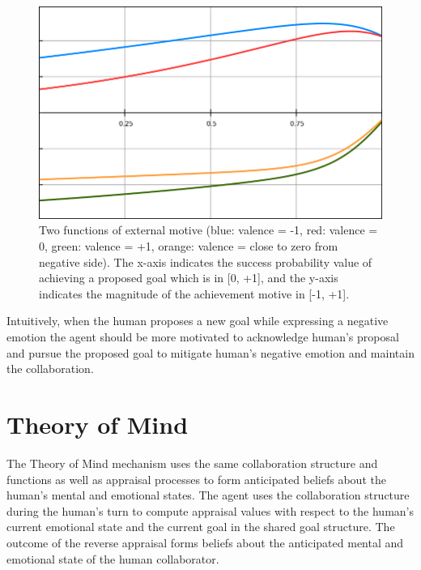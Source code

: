 \documentclass[12pt]{report}
\begin{document}
\begin{figure}[tbh]
  \centering
  \includegraphics[width=1\textwidth]{figure/external_motive_functions.png}
  \caption{Two functions of external motive (blue: valence = -1, red:
  valence = 0, green: valence = +1, orange: valence = close to zero from
  negative side). The x-axis indicates the success probability value of
  achieving a proposed goal which is in [0, +1], and the y-axis indicates the
  magnitude of the achievement motive in [-1, +1].}
  \label{fig:external-motive-functions}
\end{figure}

Intuitively, when the human proposes a new goal while expressing a negative
emotion the agent should be more motivated to acknowledge human's proposal and
pursue the proposed goal to mitigate human's negative emotion and maintain the
collaboration.

\section{Theory of Mind}
The Theory of Mind mechanism uses the same collaboration structure and functions
as well as appraisal processes to form anticipated beliefs about the human's
mental and emotional states. The agent uses the collaboration structure during the
human's turn to compute appraisal values with respect to the human's current
emotional state and the current goal in the shared goal structure. The outcome
of the reverse appraisal forms beliefs about the anticipated mental and
emotional state of the human collaborator.
\end{document}
